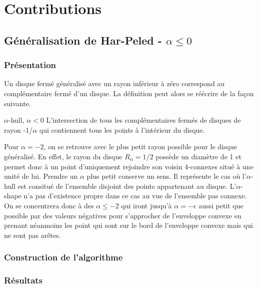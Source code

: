 \section{Contributions}

\subsection{Généralisation de Har-Peled - $\alpha \leq 0$}

\subsubsection{Présentation}

Un disque fermé généralisé avec un rayon inférieur à zéro correspond au complémentaire fermé d'un disque. La définition peut alors se réécrire de la façon suivante.
\begin{Definition}{$\alpha$-hull, $\alpha < 0$}
\label{def:nas}
    L'intersection de tous les complémentaires fermés de disques de rayon -1/$\alpha$ qui contiennent tous les points à l’intérieur du disque.
\end{Definition}

Pour $\alpha = -2$, on se retrouve avec le plus petit rayon possible pour le disque généralisé. En effet, le rayon du disque $R_{\alpha} = 1/2$ possède un diamètre de 1 et permet donc à un point d'uniquement rejoindre son voisin 4-connexes situé à une unité de lui. Prendre un $\alpha$ plus petit conserve un sens. Il représente le cas où l'$\alpha$-hull est consitué de l'ensemble disjoint des points appartenant au disque. L'$\alpha$-shape n'a pas d'existence propre dans ce cas au vue de l'ensemble pas connexe. On se concentrera donc à des $\alpha \leq -2$ qui iront jusqu'à $\alpha = -\epsilon$ aussi petit que possible par des valeurs négatives pour s'approcher de l'enveloppe convexe en prenant néanmoins les point qui sont sur le bord de l'enveloppe convexe mais qui ne sont pas arêtes.


\subsubsection{Construction de l'algorithme}

\subsubsection{Résultats}





